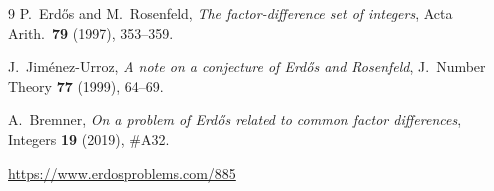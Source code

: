 \documentclass[11pt,a4paper]{article}
\theoremstyle{definition}
\theoremstyle{remark}
\begin{document}
\begin{thebibliography}{9}
P.~Erd\H{o}s and M.~Rosenfeld,
\emph{The factor-difference set of integers},
Acta Arith.\ \textbf{79} (1997), 353--359.

J.~Jim\'enez-Urroz,
\emph{A note on a conjecture of Erd\H{o}s and Rosenfeld},
J.~Number Theory \textbf{77} (1999), 64--69.

A.~Bremner,
\emph{On a problem of Erd\H{o}s related to common factor differences},
Integers \textbf{19} (2019), \#A32.

\url{https://www.erdosproblems.com/885}
\end{thebibliography}
\end{document}
